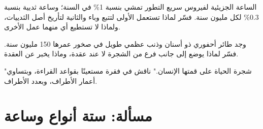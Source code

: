 \begin{exercise}[$\star\star\star$]\label{exo:g12:phylogenetic-trees:13}
الساعة الجزيئية لفيروس سريع التطور تمشي بنسبة 1\% في السنة؛ وساعة
 ثديية بنسبة 0.3\% لكل مليون سنة. فسّر لماذا تستعمل الأولى لتتبع
وباء والثانية لتأريخ أصل الثدييات، ولماذا لا تستطيع أي منهما عمل
الأخرى.
\end{exercise}

\begin{exercise}[$\star\star\star$]\label{exo:g12:phylogenetic-trees:14}
وجد طائر أحفوري ذو أسنان وذنب عظمي طويل في صخور عمرها 150 مليون سنة.
فسّر لماذا يوضع إلى جانب فرع من الشجرة لا عند عقدة، وماذا يخبر عن
العقدة.
\end{exercise}

\begin{exercise}[$\star\star\star$]\label{exo:g12:phylogenetic-trees:15}
"شجرة الحياة على قمتها الإنسان." ناقش في فقرة مستعينًا بقواعد القراءة،
وبتساوي أعمار الأطراف، وبعدد الأطراف.
\end{exercise}

\section{مسألة: ستة أنواع وساعة}

